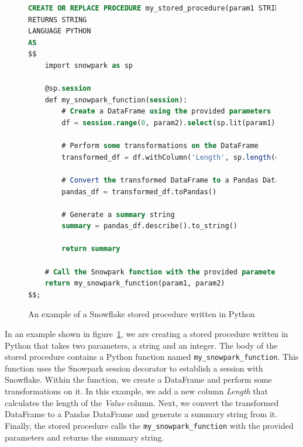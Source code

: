 \begin{figure}[ht]
\begin{lstlisting}[language=SQL]
CREATE OR REPLACE PROCEDURE my_stored_procedure(param1 STRING, param2 INT)
RETURNS STRING
LANGUAGE PYTHON
AS
$$
    import snowpark as sp

    @sp.session
    def my_snowpark_function(session):
        # Create a DataFrame using the provided parameters
        df = session.range(0, param2).select(sp.lit(param1).alias('Value'))
        
        # Perform some transformations on the DataFrame
        transformed_df = df.withColumn('Length', sp.length(df['Value']))
        
        # Convert the transformed DataFrame to a Pandas DataFrame
        pandas_df = transformed_df.toPandas()
        
        # Generate a summary string
        summary = pandas_df.describe().to_string()
        
        return summary
    
    # Call the Snowpark function with the provided parameters
    return my_snowpark_function(param1, param2)
$$;
\end{lstlisting}
\caption{An example of a Snowflake stored procedure written in Python}
\label{fig:snowflakeScript}
\end{figure}

\par
In an example shown in figure~\ref{fig:snowflakeScript}, we are creating a stored procedure written in Python that takes two parameters, a string and an integer. The body of the stored procedure contains a Python function named \texttt{my\_snowpark\_function}. This function uses the Snowpark session decorator to establish a session with Snowflake. Within the function, we create a DataFrame and perform some transformations on it. In this example, we add a new column \textit{Length} that calculates the length of the \textit{Value} column. Next, we convert the transformed DataFrame to a Pandas DataFrame and generate a summary string from it. Finally, the stored procedure calls the \texttt{my\_snowpark\_function} with the provided parameters and returns the summary string.

